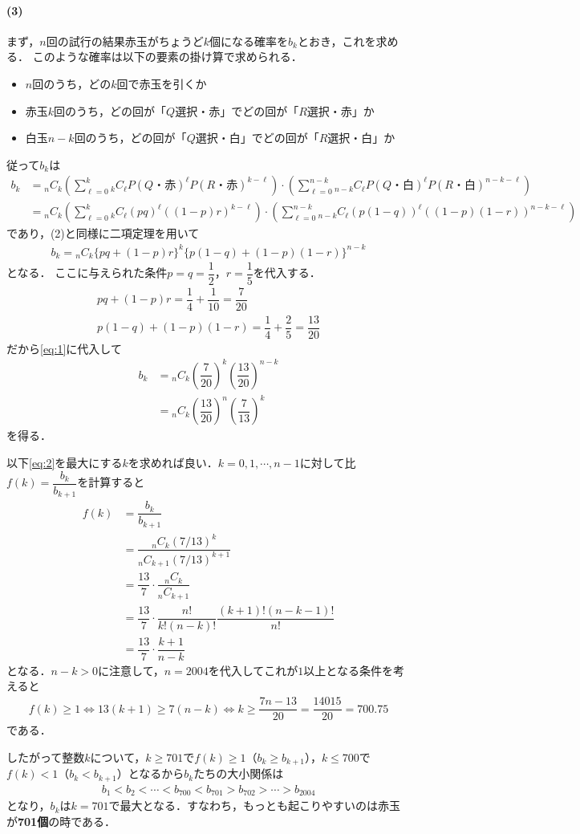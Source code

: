 \documentclass[../../main.tex]{subfiles}
\begin{document}
\paragraph{(3)}
まず，$n$回の試行の結果赤玉がちょうど$k$個になる確率を$b_k$とおき，これを求める．
このような確率は以下の要素の掛け算で求められる．
\begin{itemize}
  \item $n$回のうち，どの$k$回で赤玉を引くか
  \item 赤玉$k$回のうち，どの回が「$Q$選択・赤」でどの回が「$R$選択・赤」か
  \item 白玉$n-k$回のうち，どの回が「$Q$選択・白」でどの回が「$R$選択・白」か
\end{itemize}
従って$b_k$は
\begin{align}
  b_{k}
  &= {}_nC_{k}\left(\sum_{\ell=0}^{k}{}_kC_{\ell}P(Q\text{・赤})^{\ell}P(R\text{・赤})^{k-\ell}\right)\cdot\left(\sum_{\ell=0}^{n-k}{}_{n-k}C_{\ell}P(Q\text{・白})^{\ell}P(R\text{・白})^{n-k-\ell}\right) \\
  &= {}_nC_{k}\left(\sum_{\ell=0}^{k}{}_kC_{\ell}(pq)^{\ell}((1-p)r)^{k-\ell}\right)\cdot\left(\sum_{\ell=0}^{n-k}{}_{n-k}C_{\ell}(p(1-q))^{\ell}((1-p)(1-r))^{n-k-\ell}\right)
\end{align}
であり，(2)と同様に二項定理を用いて
\begin{align}
  b_k={}_nC_k\{pq+(1-p)r\}^k\{p(1-q)+(1-p)(1-r)\}^{n-k} \label{eq:1}
\end{align}
となる．
ここに与えられた条件$p=q=\dfrac{1}{2}$，$r=\dfrac{1}{5}$を代入する．
\begin{align}
  pq+(1-p)r=\dfrac{1}{4}+\dfrac{1}{10}=\dfrac{7}{20} \\
  p(1-q)+(1-p)(1-r)=\dfrac{1}{4}+\dfrac{2}{5}=\dfrac{13}{20}
\end{align}
だから\cref{eq:1}に代入して
\begin{align}
  b_k
  &={}_nC_k\left(\dfrac{7}{20}\right)^k\left(\dfrac{13}{20}\right)^{n-k}\\
  &={}_nC_k\left(\dfrac{13}{20}\right)^n\left(\dfrac{7}{13}\right)^k \label{eq:2}
\end{align}
を得る．

以下\cref{eq:2}を最大にする$k$を求めれば良い．$k=0,1,\cdots,n-1$に対して比$f(k)=\dfrac{b_{k}}{b_{k+1}}$を計算すると
\begin{align}
  f(k)
  &=\dfrac{b_k}{b_{k+1}} \\
  &=\dfrac{{}_nC_k(7/13)^k}{{}_nC_{k+1}(7/13)^{k+1}} \\
  &=\dfrac{13}{7}\cdot\dfrac{{}_nC_k}{{}_nC_{k+1}} \\
  &=\dfrac{13}{7}\cdot\dfrac{n!}{k!(n-k)!}\dfrac{(k+1)!(n-k-1)!}{n!} \\
  &=\dfrac{13}{7}\cdot\dfrac{k+1}{n-k}
\end{align}
となる．$n-k>0$に注意して，$n=2004$を代入してこれが$1$以上となる条件を考えると
\begin{align}
  f(k)\ge 1 \iff 13(k+1)\ge 7(n-k) \iff k \ge \dfrac{7n-13}{20}=\dfrac{14015}{20}=700.75
\end{align}
である．

したがって整数$k$について，$k\ge701$で$f(k)\ge1$（$b_k\ge b_{k+1}$），$k\le700$で$f(k)<1$（$b_k<b_{k+1}$）となるから$b_k$たちの大小関係は
\begin{align}
  b_1<b_2<\cdots<b_{700}<b_{701}>b_{702}>\cdots>b_{2004}
\end{align}
となり，$b_k$は$k=701$で最大となる．すなわち，もっとも起こりやすいのは赤玉が\textbf{701個}の時である．

\newpage
\end{document}
